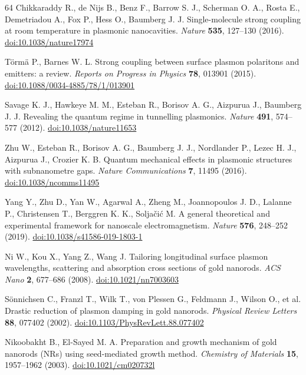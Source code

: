 \begin{thebibliography}{64}
 Chikkaraddy R., de Nijs B., Benz F., Barrow S. J., Scherman O. A., Rosta E., Demetriadou A., Fox P., Hess O., Baumberg J. J. Single-molecule strong coupling at room temperature in plasmonic nanocavities. \textit{Nature} \textbf{535}, 127--130 (2016). \href{https://doi.org/10.1038/nature17974}{doi:10.1038/nature17974}

 Törmä P., Barnes W. L. Strong coupling between surface plasmon polaritons and emitters: a review. \textit{Reports on Progress in Physics} \textbf{78}, 013901 (2015). \href{https://doi.org/10.1088/0034-4885/78/1/013901}{doi:10.1088/0034-4885/78/1/013901}

 Savage K. J., Hawkeye M. M., Esteban R., Borisov A. G., Aizpurua J., Baumberg J. J. Revealing the quantum regime in tunnelling plasmonics. \textit{Nature} \textbf{491}, 574--577 (2012). \href{https://doi.org/10.1038/nature11653}{doi:10.1038/nature11653}

 Zhu W., Esteban R., Borisov A. G., Baumberg J. J., Nordlander P., Lezec H. J., Aizpurua J., Crozier K. B. Quantum mechanical effects in plasmonic structures with subnanometre gaps. \textit{Nature Communications} \textbf{7}, 11495 (2016). \href{https://doi.org/10.1038/ncomms11495}{doi:10.1038/ncomms11495}

 Yang Y., Zhu D., Yan W., Agarwal A., Zheng M., Joannopoulos J. D., Lalanne P., Christensen T., Berggren K. K., Soljačić M. A general theoretical and experimental framework for nanoscale electromagnetism. \textit{Nature} \textbf{576}, 248--252 (2019). \href{https://doi.org/10.1038/s41586-019-1803-1}{doi:10.1038/s41586-019-1803-1}

 Ni W., Kou X., Yang Z., Wang J. Tailoring longitudinal surface plasmon wavelengths, scattering and absorption cross sections of gold nanorods. \textit{ACS Nano} \textbf{2}, 677--686 (2008). \href{https://doi.org/10.1021/nn7003603}{doi:10.1021/nn7003603}

 Sönnichsen C., Franzl T., Wilk T., von Plessen G., Feldmann J., Wilson O., et al. Drastic reduction of plasmon damping in gold nanorods. \textit{Physical Review Letters} \textbf{88}, 077402 (2002). \href{https://doi.org/10.1103/PhysRevLett.88.077402}{doi:10.1103/PhysRevLett.88.077402}

 Nikoobakht B., El-Sayed M. A. Preparation and growth mechanism of gold nanorods (NRs) using seed-mediated growth method. \textit{Chemistry of Materials} \textbf{15}, 1957--1962 (2003). \href{https://doi.org/10.1021/cm020732l}{doi:10.1021/cm020732l}


\end{thebibliography}
